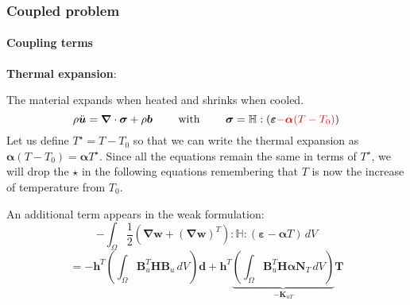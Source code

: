 \documentclass[10pt,xcolor=pdftex,dvipsnames,table]{beamer}
\begin{document}
\begin{frame}
	\frametitle{ Coupled problem }
	\framesubtitle{ Coupling terms  }
	
	\textbf{Thermal expansion}:
	
	The material expands when heated and shrinks when cooled. 
	\begin{equation*}
		\rho \ddot{\boldsymbol{u}} = \boldsymbol{\nabla}\cdot\boldsymbol{\sigma} + \rho\boldsymbol{b}
		\qquad\text{ with }
		\qquad		\boldsymbol{\sigma}  	= \mathbb{H}: \left( \boldsymbol{\varepsilon} {\color{red} - \boldsymbol{\alpha} (T-T_0)}   \right) 
	\end{equation*}
	Let us define $T^{\star} = T-T_0$ so that we can write the thermal expansion as $\boldsymbol{\alpha}(T-T_0) = \boldsymbol{\alpha}T^{\star}$. Since all the equations remain the same in terms of $T^{\star}$, we will drop the $\star$ in the following equations remembering that $T$ is now the increase of temperature from $T_0$.
	
	
	An additional term appears in the weak formulation:
	\begin{equation*}
	- \int_{\Omega} 
		\frac{1}{2} \left( \boldsymbol{\nabla}\boldsymbol{w} + (\boldsymbol{\nabla}\boldsymbol{w})^T \right) 
		: \mathbb{H}: \left( \boldsymbol{\varepsilon} - \boldsymbol{\alpha} T   \right)
	\, dV		
\end{equation*}		
	\begin{equation*}
	= - \boldsymbol{h}^T \left(\int_{\Omega}\mathbf{B}_u^T\mathbf{H}\mathbf{B}_u \, dV \right) \boldsymbol{d} + \boldsymbol{h}^T 
	\underbrace{\left( \int_{\Omega} 
	  \mathbf{B}_u^T \mathbf{H} \boldsymbol{\alpha}\mathbf{N}_T \, dV \right)}_{-\mathbf{K}_{uT}}	\boldsymbol{T}	
\end{equation*}			
	
\end{frame}
\end{document}
